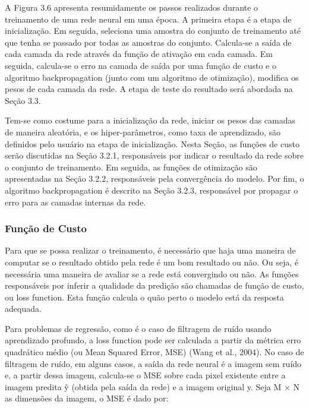 A Figura 3.6 apresenta resumidamente os passos realizados durante o treinamento de uma rede neural em uma época. A primeira etapa é a etapa de inicialização. Em seguida, seleciona uma amostra do conjunto de treinamento até que tenha se passado por todas as amostras do conjunto. Calcula-se a saída de cada camada da rede através da função de ativação em cada camada. Em seguida, calcula-se o erro na camada de saída por uma função de custo e o algoritmo backpropagation (junto com um algoritmo de otimização), modifica os pesos de cada camada da rede. A etapa de teste do resultado será abordada na Seção 3.3.

Tem-se como costume para a inicialização da rede, iniciar os pesos das camadas de maneira aleatória, e os hiper-parâmetros, como taxa de aprendizado, são definidos pelo usuário na etapa de inicialização. Nesta Seção, as funções de custo serão discutidas na Seção 3.2.1, responsáveis por indicar o resultado da rede sobre o conjunto de treinamento. Em seguida, as funções de otimização são apresentadas na Seção 3.2.2, responsáveis pela convergência do modelo. Por fim, o algoritmo backpropagation é descrito na Seção 3.2.3, responsável por propagar o erro para as camadas internas da rede.


\subsubsection{Função de Custo}

Para que se possa realizar o treinamento, é necessário que haja uma maneira de computar se o resultado obtido pela rede é um bom resultado ou não. Ou seja, é necessária uma maneira de avaliar se a rede está convergindo ou não. As funções responsáveis por inferir a qualidade da predição são chamadas de função de custo, ou loss function. Esta função calcula o quão perto o modelo está da resposta adequada.

Para problemas de regressão, como é o caso de filtragem de ruído usando aprendizado profundo, a loss function pode ser calculada a partir da métrica erro quadrático médio (ou Mean Squared Error, MSE) (Wang et al., 2004). No caso de filtragem de ruído, em alguns casos, a saída da rede neural é a imagem sem ruído e, a partir dessa imagem, calcula-se o MSE sobre cada pixel existente entre a imagem predita ŷ (obtida pela saída da rede) e a imagem original y. Seja M × N as dimensões da imagem, o MSE é dado por:

